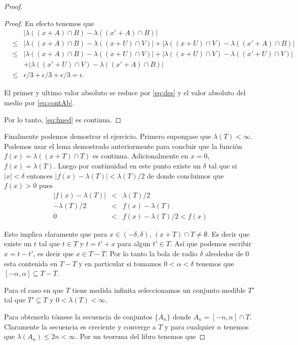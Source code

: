 \documentclass[letter,twoside,12pt]{article}
\numberwithin{equation}{section}
\begin{document}
\begin{proof}
\begin{proof}
En efecto tenemos que
\begin{eqnarray*}
& &  |\lambda((x+A) \cap B)- \lambda((x'+A) \cap B)|
\\&\leq&  |\lambda((x+A) \cap B)-\lambda((x+U) \cap V)|+|\lambda((x+U) \cap V)- \lambda((x'+A) \cap B)|
\\&\leq&  |\lambda((x+A) \cap B)-\lambda((x+U) \cap V)|+|\lambda((x+U) \cap V)- \lambda((x'+U) \cap V)|
\\& & + |\lambda((x'+U) \cap V) - \lambda((x'+A) \cap B)|
\\ & \leq & \epsilon/3 + \epsilon/3 + \epsilon/3 = \epsilon.
\end{eqnarray*}

El primer y ultimo valor absoluto se reduce por \eqref{eq:des} y el valor absoluto del medio por \eqref{eq:contAb}.

Por lo tanto, \eqref{eq:fmed} es continua.\end{proof}

Finalmente podemos demostrar el ejercicio. Primero supongase que $ \lambda(T) < \infty $. Podemos usar el lema demostrado anteriormente para concluir que la función $ f(x) = \lambda((x+T)\cap T)$ es continua. Adicionalmente en $x = 0 $, $f(x) = \lambda(T)$. Luego por continuidad en este punto existe un $\delta$ tal que si $ |x| < \delta $ entonces $|f(x)-\lambda(T)| < \lambda(T)/2 $ de donde concluimos que $f(x) > 0 $ pues
\begin{eqnarray*}
|f(x)-\lambda(T)| &<& \lambda(T)/2
\\-\lambda(T)/2 &<& f(x)-\lambda(T)
\\ 0 &<& f(x) -\lambda(T)/2 < f(x)
\end{eqnarray*}

Esto implica claramente que para $x \in (-\delta,\delta)$,  $(x+T)\cap T \not = \emptyset $. Es decir que existe un $t $ tal que $t \in T $ y $t = t'+x $ para algun $t' \in T $. Así que podemos escribir $x = t-t'$, es decir que $ x \in T - T $.
Por lo tanto la bola de radio $\delta $ alrededor de 0 esta contenida en $T - T$ y en particular si tomamos $0<\alpha<\delta$ tenemos que $[-\alpha,\alpha] \subseteq T-T$.

Para el caso en que $T$ tiene medida infinita seleccionamos un conjunto medible $T'$ tal que $T' \subseteq T$ y $ 0<\lambda(T) < \infty $.

Para obtenerlo tómese la secuencia de conjuntos $\{A_n\}$ donde $A_n = [-n,n] \cap T $. Claramente la secuencia es creciente y converge a $ T $ y para cualquier $n$ tenemos que $\lambda(A_n) \leq 2n < \infty $. Por un teorema del libro \cite[Teorema 10.13]{hewitt} tenemos que


\end{proof}
\end{document}
